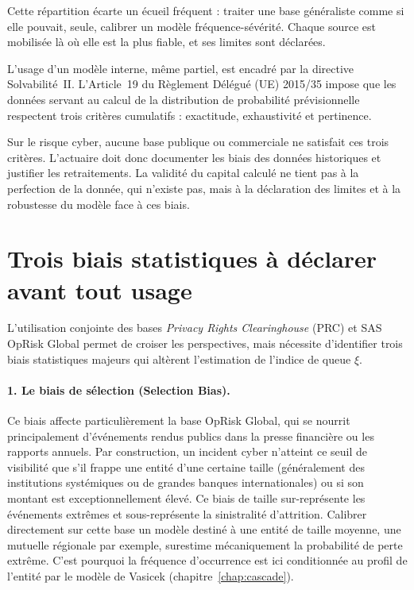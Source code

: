 Cette répartition écarte un écueil fréquent : traiter une base généraliste comme si elle
pouvait, seule, calibrer un modèle fréquence-sévérité. Chaque source est mobilisée là où elle
est la plus fiable, et ses limites sont déclarées.



L'usage d'un modèle interne, même partiel, est encadré par la directive Solvabilité~II.
L'Article~19 du Règlement Délégué (UE) 2015/35 impose que les données servant au calcul de la
distribution de probabilité prévisionnelle respectent trois critères cumulatifs : exactitude,
exhaustivité et pertinence.

Sur le risque cyber, aucune base publique ou commerciale ne satisfait ces trois critères.
L'actuaire doit donc documenter les biais des données historiques et justifier les
retraitements. La validité du capital calculé ne tient pas à la perfection de la donnée, qui
n'existe pas, mais à la déclaration des limites et à la robustesse du modèle face à ces
biais.




\section{Trois biais statistiques à déclarer avant tout usage}

L'utilisation conjointe des bases \textit{Privacy Rights Clearinghouse} (PRC) et SAS OpRisk Global permet de croiser les perspectives, mais nécessite d'identifier trois biais statistiques majeurs qui altèrent l'estimation de l'indice de queue $\xi$.

\paragraph{1. Le biais de sélection (Selection Bias).}
Ce biais affecte particulièrement la base OpRisk Global, qui se nourrit principalement d'événements rendus publics dans la presse financière ou les rapports annuels. Par construction, un incident cyber n'atteint ce seuil de visibilité que s'il frappe une entité d'une certaine taille (généralement des institutions systémiques ou de grandes banques internationales) ou si son montant est exceptionnellement élevé.
Ce biais de taille sur-représente les événements extrêmes et sous-représente la sinistralité
d'attrition. Calibrer directement sur cette base un modèle destiné à une entité de taille
moyenne, une mutuelle régionale par exemple, surestime mécaniquement la probabilité de perte
extrême. C'est pourquoi la fréquence d'occurrence est ici conditionnée au profil de l'entité
par le modèle de Vasicek (chapitre~\ref{chap:cascade}).

